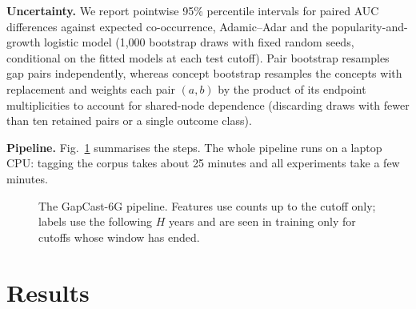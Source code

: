 \documentclass[runningheads]{llncs}
\newcommand{\bench}{GapCast-6G}
\begin{document}
\textbf{Uncertainty.} We report pointwise 95\% percentile intervals for paired AUC differences against expected co-occurrence, Adamic--Adar and the popularity-and-growth logistic model (1,000 bootstrap draws with fixed random seeds, conditional on the fitted models at each test cutoff). Pair bootstrap resamples gap pairs independently, whereas concept bootstrap resamples the \nConcepts{} concepts with replacement and weights each pair $(a,b)$ by the product of its endpoint multiplicities to account for shared-node dependence (discarding draws with fewer than ten retained pairs or a single outcome class).

\textbf{Pipeline.} Fig.~\ref{fig:pipeline} summarises the steps. The whole pipeline runs on a laptop CPU: tagging the corpus takes about 25 minutes and all experiments take a few minutes.

\begin{figure}[t]
\centering
{}
\caption{The \bench{} pipeline. Features use counts up to the cutoff only; labels use the following $H$ years and are seen in training only for cutoffs whose window has ended.}
\label{fig:pipeline}
\end{figure}

\section{Results}
\end{document}
